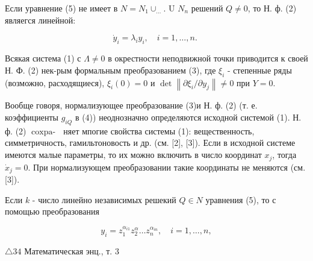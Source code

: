 \documentclass[10pt]{article}
\begin{document}
Если уравнение (5) не имеет в $N=N_{1} \cup_{\ldots}$. U $N_{n}$ решений $Q \neq 0$, то Н. ф. (2) являегся линейной:



\[

\dot{y}_{i}=\lambda_{i} y_{i}, \quad i=1, \ldots, n \text {. }

\]



Всякая система (1) с $\Lambda \neq 0$ в окрестности неподвижной точки приводится к своей Н. Ф. (2) нек-рым формальным преобразованием (3), где $\xi_{i}$ - степенные ряды (возможно, расходящиеся), $\xi_{i}(0)=0$ и $\operatorname{det}\left\|\partial \xi_{i} / \partial y_{j}\right\| \neq 0$ при $Y=0$.



Вообще говоря, нормализующее преобразование (3)и Н. ф. (2) (т. е. коэффициенты $g_{i Q}$ в (4)) неоднозначно определяются исходной системой (1). Н. ф. (2) $\operatorname{coxpa-~}$ няет мпогие свойства системы (1): вещественность, симметричность, гамильтоновость и др. (см. [2], [3]). Если в исходной системе имеются малые параметры, то их можно включить в число координат $x_{j}$, тогда $\dot{x}_{j}=0$. При нормализующем преобразовании такие координаты не меняются (см. [3]).



Если $k$ - число линейно независимых решекий $Q \in N$ уравнения (5), то с помощью преобразования



\[

y_{i}=z_{1}^{\alpha_{i 1}} z_{2}^{\alpha} \ldots z_{n}^{\alpha_{i n}}, \quad i=1, \ldots, n,

\]



$\triangle 34$ Математическая энц., т. 3
\end{document}
